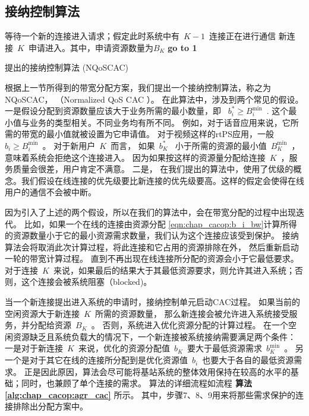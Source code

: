 \subsection{接纳控制算法}
\label{sec_alg}
\begin{algorithm}[htbp]
\SetAlgoLined
等待一个新的连接进入请求；假定此时系统中有~$K-1$~连接正在进行通信\;
新连接~$K$~申请进入。其中，申请资源数量为$B_K$\;
{\bf{go to 1}}\;
\caption{提出的接纳控制算法 (NQoSCAC)} \label{alg:chap_cacop:agr_cac}
\end{algorithm}

根据上一节所得到的带宽分配方案，我们提出一个接纳控制算法，称之为NQoSCAC， （Normalized QoS CAC ）。
在此算法中，涉及到两个常见的假设。 一是假设分配到资源数量应该大于业务所需的最小数量，即
~$b_i^* \ge B_i^{\min}$~. 
这个最小值与业务的类型相关。不同业务均有所不同。
例如，对于话音应用来说，它所需的带宽的最小值就被设置为它申请值。
对于视频这样的rtPS应用，一般~$b_i\ge B_i^{\min}$~。
对于新用户~$K$~而言，
如果~$b_K^*$~ 小于所需的资源的最小值~$B_K^{\min}$~，意味着系统会拒绝这个连接进入。
因为如果按这样的资源量分配给连接~$K$~，服务质量会很差，用户肯定不满意。
二是，
在我们提出的算法中，使用了优级的概念。我们假设在线连接的优先级要比新连接的优先级要高。这样的假定会使得在线用户的通信不会被中断。

因为引入了上述的两个假设，所以在我们的算法中，会在带宽分配的过程中出现迭代。
比如，如果一个在线的连接由资源分配 \eqref{eqn:chap_cacop:b_i_bw}计算所得的资源数量小于它的最小资源需求数量，我们认为这个连接应该受到保护。
接纳算法会将取消此次计算过程，将此连接和它占用的资源排除在外，
然后重新启动一轮的带宽计算过程。
直到不再出现在线连接所分配的资源会小于它最低要求。
对于连接~$K$~来说，如果最后的结果大于其最低资源要求，则允许其进入系统；否则，这个连接会被系统阻塞（blocked)。


当一个新连接提出进入系统的申请时，接纳控制单元启动CAC过程。
如果当前的空闲资源大于新连接~$K$~所需的资源数量，
那么新连接会被允许进入系统接受服务，并分配给资源~$B_K$~。
否则，系统进入优化资源分配的计算过程。
在一个空闲资源缺乏且系统负载大的情况下，一个新连接被系统接纳需要满足两个条件：
一是对于新连接~$K$~来说，优化的资源分配值~$b_K$~要大于最低资源需求~$b_K^{\min}$~。
另一个是对于其它在线的连接所分配到是优化资源值~$b_i$~也要大于各自的最低资源需求。
正是因此原因，算法会尽可能将基站系统的整体效用保持在较高的水平的基础；同时，也兼顾了单个连接的需求。
算法的详细流程如流程{\bf{ 算法 \ref{alg:chap_cacop:agr_cac}}} 所示。
其中，步骤7、8、9用来将那些需求保护的连接排除出分配方案中。


